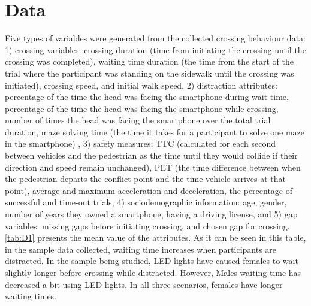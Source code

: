 \section{Data}
\label{S:D5}
Five types of variables were generated from the collected crossing behaviour data: 1) crossing variables: crossing duration (time from initiating the crossing until the crossing was completed), waiting time duration (the time from the start of the trial where the participant was standing on the sidewalk until the crossing was initiated), crossing speed, and initial walk speed, 2) distraction attributes: percentage of the time the head was facing the smartphone during wait time, percentage of the time the head was facing the smartphone while crossing, number of times the head was facing the smartphone over the total trial duration, maze solving time (the time it takes for a participant to solve one maze in the smartphone) , 3) safety measures: TTC (calculated for each second between vehicles and the pedestrian as the time until they would collide if their direction and speed remain unchanged), PET (the time difference between when the pedestrian departs the conflict point and the time vehicle arrives at that point), average and maximum acceleration and deceleration, the percentage of successful and time-out trials, 4) sociodemographic information: age, gender, number of years they owned a smartphone, having a driving license, and 5) gap variables: missing gaps before initiating crossing, and chosen gap for crossing. \cref{tab:D1} presents the mean value of the attributes. As it can be seen in this table, in the sample data collected, waiting time increases when participants are distracted. In the sample being studied, LED lights have caused females to wait slightly longer before crossing while distracted. However, Males waiting time has decreased a bit using LED lights. In all three scenarios, females have longer waiting times. 


